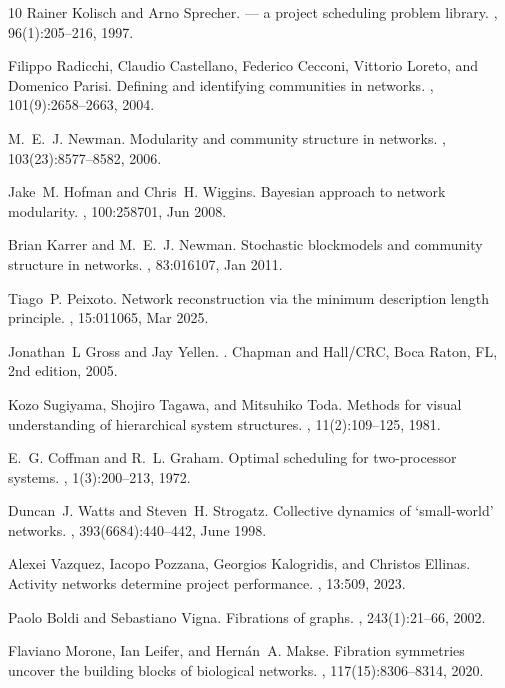 \documentclass[11pt,a4paper]{article}
\begin{document}
\begin{thebibliography}{10}
Rainer Kolisch and Arno Sprecher.
 --- a project scheduling problem library.
, 96(1):205--216, 1997.

Filippo Radicchi, Claudio Castellano, Federico Cecconi, Vittorio Loreto, and
  Domenico Parisi.
\newblock Defining and identifying communities in networks.
,
  101(9):2658--2663, 2004.

M.~E.~J. Newman.
\newblock Modularity and community structure in networks.
,
  103(23):8577--8582, 2006.

Jake~M. Hofman and Chris~H. Wiggins.
\newblock Bayesian approach to network modularity.
, 100:258701, Jun 2008.

Brian Karrer and M.~E.~J. Newman.
\newblock Stochastic blockmodels and community structure in networks.
, 83:016107, Jan 2011.

Tiago~P. Peixoto.
\newblock Network reconstruction via the minimum description length principle.
, 15:011065, Mar 2025.

Jonathan~L Gross and Jay Yellen.
.
\newblock Chapman and Hall/CRC, Boca Raton, FL, 2nd edition, 2005.

Kozo Sugiyama, Shojiro Tagawa, and Mitsuhiko Toda.
\newblock Methods for visual understanding of hierarchical system structures.
,
  11(2):109--125, 1981.

E.~G. Coffman and R.~L. Graham.
\newblock Optimal scheduling for two-processor systems.
, 1(3):200--213, 1972.

Duncan~J. Watts and Steven~H. Strogatz.
\newblock Collective dynamics of ‘small-world’ networks.
, 393(6684):440--442, June 1998.

Alexei Vazquez, Iacopo Pozzana, Georgios Kalogridis, and Christos Ellinas.
\newblock Activity networks determine project performance.
, 13:509, 2023.

Paolo Boldi and Sebastiano Vigna.
\newblock Fibrations of graphs.
, 243(1):21--66, 2002.

Flaviano Morone, Ian Leifer, and Hernán~A. Makse.
\newblock Fibration symmetries uncover the building blocks of biological
  networks.
,
  117(15):8306--8314, 2020.

\end{thebibliography}
\end{document}
